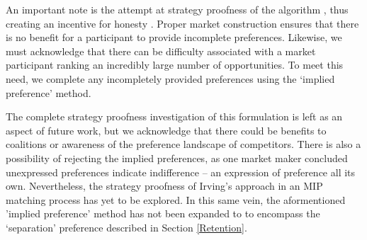 An important note is the attempt at strategy proofness of the algorithm \citep{2011_Budish} \citep{2006_Atila}, thus creating an incentive for honesty \citep{1982_Roth}. Proper market construction ensures that there is no benefit for a participant to provide incomplete preferences.  Likewise, we must acknowledge that there can be difficulty associated with a market participant ranking an incredibly large number of opportunities. To meet this need, we complete any incompletely provided preferences using the `implied preference’ method\citep{2019_Shaw}. 

The complete strategy proofness investigation of this formulation is left as an aspect of future work, but we acknowledge that there could be benefits to coalitions or awareness of the preference landscape of competitors. There is also a possibility of rejecting the implied preferences, as one market maker concluded unexpressed preferences indicate indifference \citep{1994_Irving} -- an expression of preference all its own. Nevertheless, the strategy proofness of Irving’s approach in an MIP matching process has yet to be explored. In this same vein, the aformentioned 'implied preference' method has not been expanded to to encompass the `separation' preference described in Section \ref{Retention}. 
